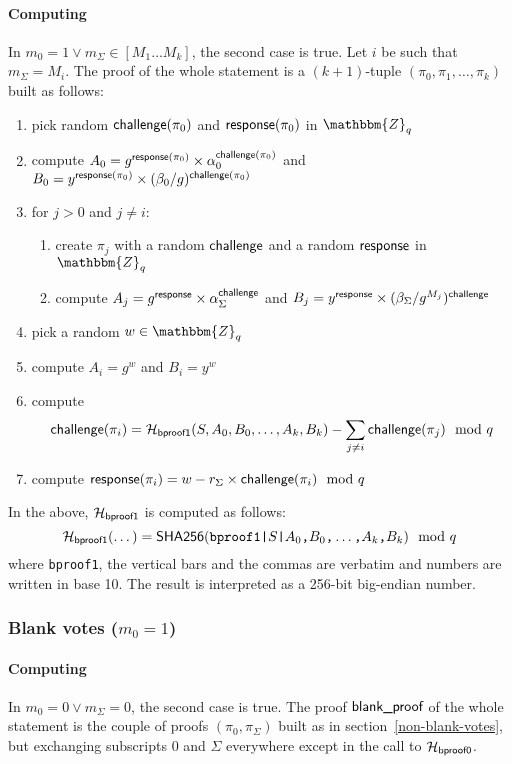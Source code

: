 \documentclass[a4paper]{article}
\newcommand{\Z}{\mathbbm{Z}}
\newcommand{\shatwo}{\textsf{SHA256}}
\begin{document}
\paragraph{Computing \oproof}
In $m_0=1\lor m_\Sigma\in[M_1\dots M_k]$, the second case
is true. Let $i$ be such that $m_\Sigma=M_i$. The proof of the whole
statement is a $(k+1)$-tuple $(\pi_0,\pi_1,\dotsc,\pi_k)$ built as
follows:
\begin{enumerate}
\item pick random $\textsf{challenge}(\pi_0)$ and $\textsf{response}(\pi_0)$
  in $\Z_q$
\item compute
  $A_0=g^{\textsf{response}(\pi_0)}\times\alpha_0^{\textsf{challenge}(\pi_0)}$
  and
  $B_0=y^{\textsf{response}(\pi_0)}\times(\beta_0/g)^{\textsf{challenge}(\pi_0)}$
\item for $j>0$ and $j\neq i$:
  \begin{enumerate}
  \item create $\pi_j$ with a random $\textsf{challenge}$ and a random
    $\textsf{response}$ in $\Z_q$
  \item compute
    $A_j={g^{\textsf{response}}}\times{\alpha_\Sigma^{\textsf{challenge}}}$ and
    $B_j={y^{\textsf{response}}}\times{(\beta_\Sigma/g^{M_j})^{\textsf{challenge}}}$
  \end{enumerate}
\item pick a random $w\in\Z_q$
\item compute $A_i=g^w$ and $B_i=y^w$
\item compute
  \[\textsf{challenge}(\pi_i)=\mathcal{H}_{\textsf{bproof1}}(S,A_0,B_0,\dots,A_k,B_k)-\sum_{j\neq i}\textsf{challenge}(\pi_j)\mod q\]
\item compute $\textsf{response}(\pi_i)=w-r_\Sigma\times\textsf{challenge}(\pi_i)\mod q$
\end{enumerate}
In the above, $\mathcal{H}_{\mathsf{bproof1}}$ is computed as follows:
\[\Hash_{\mathsf{bproof1}}(\dotsc)=
\shatwo(\verb=bproof1|=S\verb=|=A_0\verb=,=B_0\verb=,=\dotsc\verb=,=A_k\verb=,=B_k)\mod q\]
where \verb=bproof1=, the vertical bars and the commas are verbatim and
numbers are written in base 10. The result is interpreted as a 256-bit
big-endian number.

\subsubsection{Blank votes ($m_0=1$)}

\paragraph{Computing \bproof}
In $m_0=0\lor m_\Sigma=0$, the second case is true. The proof
$\textsf{blank\_proof}$ of the whole statement is the couple of proofs
$(\pi_0,\pi_\Sigma)$ built as in section~\ref{non-blank-votes}, but
exchanging subscripts $0$ and $\Sigma$ everywhere except in the call
to $\mathcal{H}_{\textsf{bproof0}}$.
\end{document}
